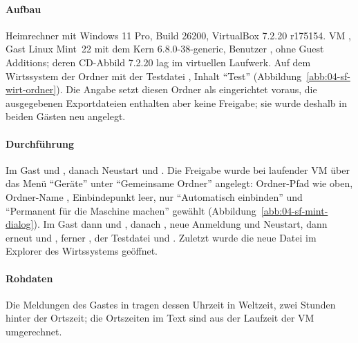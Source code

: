 \begin{messung}
\paragraph{Aufbau} Heimrechner mit Windows 11 Pro, Build 26200, VirtualBox 7.2.20 r175154. VM , Gast Linux Mint~22 mit dem Kern 6.8.0-38-generic, Benutzer , ohne Guest Additions; deren CD-Abbild 7.2.20 lag im virtuellen Laufwerk. Auf dem Wirtssystem der Ordner  mit der Testdatei , Inhalt \enquote{Test} (Abbildung~\ref{abb:04-sf-wirt-ordner}). Die Angabe setzt diesen Ordner als eingerichtet voraus, die ausgegebenen Exportdateien enthalten aber keine Freigabe; sie wurde deshalb in beiden Gästen neu angelegt.


\paragraph{Durchführung} Im Gast  und , danach Neustart und . Die Freigabe wurde bei laufender VM über das Menü \enquote{Geräte} unter \enquote{Gemeinsame Ordner} angelegt: Ordner-Pfad wie oben, Ordner-Name , Einbindepunkt leer, nur \enquote{Automatisch einbinden} und \enquote{Permanent für die Maschine machen} gewählt (Abbildung~\ref{abb:04-sf-mint-dialog}). Im Gast dann  und , danach , neue Anmeldung und Neustart, dann erneut  und , ferner ,  der Testdatei und . Zuletzt wurde die neue Datei im Explorer des Wirtssystems geöffnet.


\paragraph{Rohdaten} Die Meldungen des Gastes in  tragen dessen Uhrzeit in Weltzeit, zwei Stunden hinter der Ortszeit; die Ortszeiten im Text sind aus der Laufzeit der VM umgerechnet.


\end{messung}
